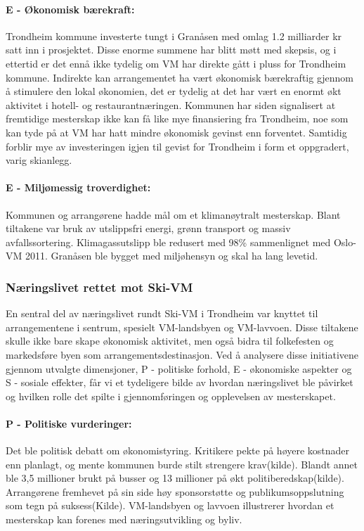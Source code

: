 \paragraph{E - Økonomisk bærekraft:} Trondheim kommune investerte tungt i Granåsen med omlag 1.2 
milliarder kr satt inn i prosjektet\cite{NRK12Milliarder}. Disse enorme summene har blitt møtt med skepsis,
og i ettertid er det ennå ikke tydelig om VM har direkte gått i pluss for Trondheim kommune\cite{AftenpostenNyVM}. 
Indirekte kan arrangementet ha vært økonomisk bærekraftig gjennom å stimulere den lokal 
økonomien, det er tydelig at det har vært en enormt økt aktivitet i hotell- og 
restaurantnæringen\cite{DagbladetPriser}. Kommunen har siden signalisert at fremtidige mesterskap ikke
kan få like mye finansiering fra Trondheim\cite{NeaRadioVM}, noe som kan tyde på at VM har hatt mindre økonomisk 
gevinst enn forventet. Samtidig forblir mye av investeringen igjen til gevist for Trondheim i form 
et oppgradert, varig skianlegg.

\paragraph{E - Miljømessig troverdighet:} Kommunen og arrangørene hadde mål om et klimanøytralt 
mesterskap\cite{TrondheimKommuneVM}. Blant tiltakene var bruk av utslippsfri energi, grønn 
transport og massiv avfallssortering. Klimagassutslipp ble redusert med 98\% sammenlignet 
med Oslo-VM 2011\cite{Trondheim2025Kutt}. Granåsen ble bygget med miljøhensyn og skal ha lang levetid. 


\subsubsection{Næringslivet rettet mot Ski-VM}
En sentral del av næringslivet rundt Ski-VM i Trondheim var knyttet til arrangementene i sentrum, 
spesielt VM-landsbyen og VM-lavvoen. Disse tiltakene skulle ikke bare skape økonomisk aktivitet, 
men også bidra til folkefesten og markedsføre byen som arrangementsdestinasjon. Ved å analysere 
disse initiativene gjennom utvalgte dimensjoner, P - politiske forhold, E - økonomiske aspekter og 
S - sosiale effekter, får vi et tydeligere bilde av hvordan næringslivet ble påvirket og hvilken 
rolle det spilte i gjennomføringen og opplevelsen av mesterskapet.

\paragraph{P - Politiske vurderinger:}
Det ble politisk debatt om økonomistyring. Kritikere pekte på høyere kostnader enn planlagt, 
og mente kommunen burde stilt strengere krav(kilde). Blandt annet ble 3,5 millioner brukt på busser 
og 13 millioner på økt politiberedskap(kilde). Arrangørene fremhevet på sin side høy sponsorstøtte og 
publikumsoppslutning som tegn på suksess(Kilde). VM-landsbyen og lavvoen illustrerer hvordan 
et mesterskap kan forenes med næringsutvikling og byliv.


